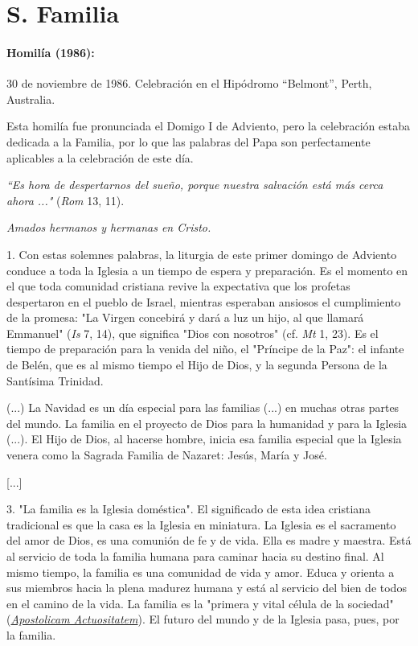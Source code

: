 \chapter{S. Familia}
\subsubsection{Homilía (1986): }
30 de noviembre de 1986. Celebración en el Hipódromo ``Belmont'', Perth,
Australia.

Esta homilía fue pronunciada el Domigo I de Adviento, pero la celebración estaba dedicada a la Familia, por lo que las palabras del Papa son perfectamente aplicables a la celebración de este día.

\emph{``Es hora de despertarnos del sueño, porque nuestra salvación está
	más cerca ahora ..."} (\emph{Rom} 13, 11).

\emph{Amados hermanos y hermanas en Cristo.}

1. Con estas solemnes palabras, la liturgia de este primer domingo de
Adviento conduce a toda la Iglesia a un tiempo de espera y preparación.
Es el momento en el que toda comunidad cristiana revive la expectativa
que los profetas despertaron en el pueblo de Israel, mientras esperaban
ansiosos el cumplimiento de la promesa: "La Virgen concebirá y dará a
luz un hijo, al que llamará Emmanuel" (\emph{Is} 7, 14), que significa
"Dios con nosotros" (cf. \emph{Mt} 1, 23). Es el tiempo de preparación
para la venida del niño, el "Príncipe de la Paz": el infante de Belén,
que es al mismo tiempo el Hijo de Dios, y la segunda Persona de la
Santísima Trinidad.

(...) La Navidad es un día especial para las familias (...) en muchas
otras partes del mundo. La familia en el proyecto de Dios para la
humanidad y para la Iglesia (...). El Hijo de Dios, al hacerse hombre,
inicia esa familia especial que la Iglesia venera como la Sagrada
Familia de Nazaret: Jesús, María y José.

{[}...{]}

3. "La familia es la Iglesia doméstica". El significado de esta idea
cristiana tradicional es que la casa es la Iglesia en miniatura. La
Iglesia es el sacramento del amor de Dios, es una comunión de fe y de
vida. Ella es madre y maestra. Está al servicio de toda la familia
humana para caminar hacia su destino final. Al mismo tiempo, la familia
es una comunidad de vida y amor. Educa y orienta a sus miembros hacia la
plena madurez humana y está al servicio del bien de todos en el camino
de la vida. La familia es la "primera y vital célula de la sociedad"
(\href{http://www.vatican.va/archive/hist_councils/ii_vatican_council/documents/vat-ii_decree_19651118_apostolicam-actuositatem_it.html}{\emph{\emph{Apostolicam
			Actuositatem}}}). El futuro del mundo y de la Iglesia pasa, pues, por la
familia.

